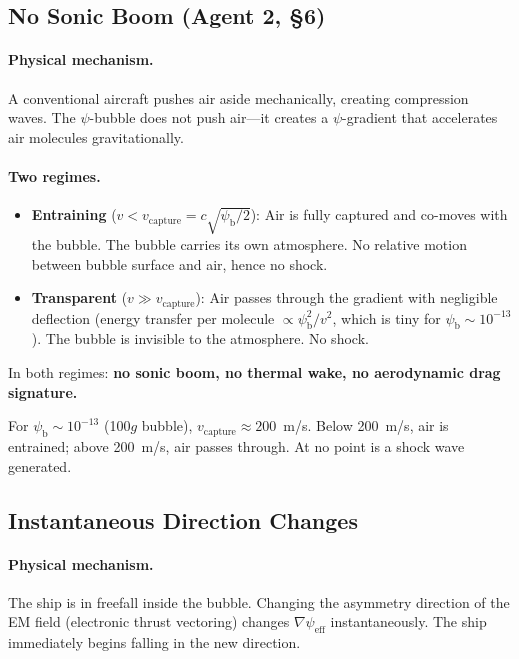 \documentclass[12pt,aps,prd,superscriptaddress,nofootinbib,longbibliography]{revtex4-2}
\newcommand{\psib}{\psi_{\mathrm{b}}}
\begin{document}
\subsection{No Sonic Boom (Agent 2, \S6)}

\paragraph{Physical mechanism.}
A conventional aircraft pushes air aside mechanically, creating compression
waves.  The $\psi$-bubble does not push air---it creates a $\psi$-gradient
that accelerates air molecules gravitationally.

\paragraph{Two regimes.}
\begin{itemize}
\item \textbf{Entraining} ($v < v_{\mathrm{capture}} = c\sqrt{\psib/2}$):
Air is fully captured and co-moves with the bubble.  The bubble carries its
own atmosphere.  No relative motion between bubble surface and air, hence
no shock.

\item \textbf{Transparent} ($v \gg v_{\mathrm{capture}}$): Air passes
through the gradient with negligible deflection (energy transfer per
molecule $\propto \psib^2/v^2$, which is tiny for $\psib \sim 10^{-13}$).
The bubble is invisible to the atmosphere.  No shock.
\end{itemize}

In both regimes: \textbf{no sonic boom, no thermal wake, no aerodynamic
drag signature.}

For $\psib \sim 10^{-13}$ (100$g$ bubble), $v_{\mathrm{capture}} \approx 200$~m/s.
Below 200~m/s, air is entrained; above 200~m/s, air passes through.  At
no point is a shock wave generated.

\subsection{Instantaneous Direction Changes}

\paragraph{Physical mechanism.}
The ship is in freefall inside the bubble.  Changing the asymmetry
direction of the EM field (electronic thrust vectoring) changes
$\nabla\psi_{\mathrm{eff}}$ instantaneously.  The ship immediately begins
falling in the new direction.
\end{document}
